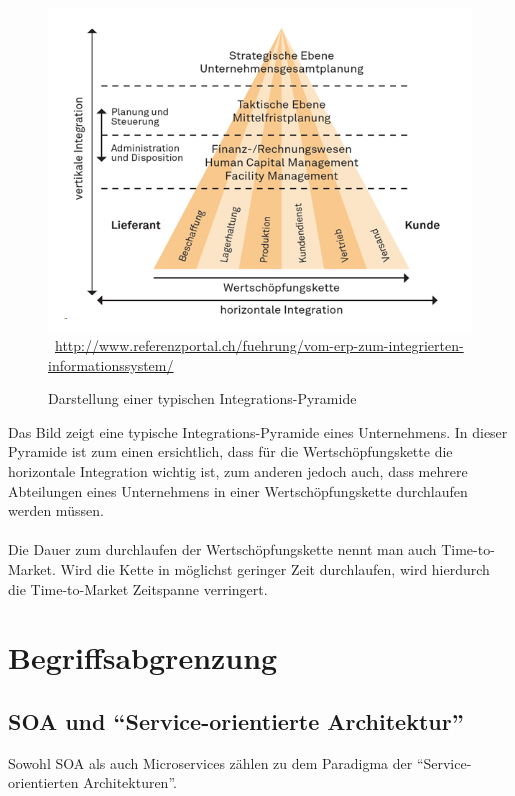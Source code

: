 \begin{figure}[htb]
    \centering 
    \includegraphics[width=\linewidth]{content/images/integrations-pyramide}\
    \quelle\url{http://www.referenzportal.ch/fuehrung/vom-erp-zum-integrierten-informationssystem/}
    \caption[Darstellung einer typischen Integrations-Pyramide]{Darstellung einer typischen Integrations-Pyramide\\}
    \label{fig:integrations-pyramide} 
\end{figure} 
Das Bild zeigt eine typische Integrations-Pyramide eines Unternehmens. In dieser Pyramide ist zum einen ersichtlich, dass für die Wertschöpfungskette die horizontale Integration wichtig ist, zum anderen jedoch auch, dass mehrere Abteilungen eines Unternehmens in einer Wertschöpfungskette durchlaufen werden müssen.
\\\\
Die Dauer zum durchlaufen der Wertschöpfungskette nennt man auch Time-to-Market. Wird die Kette in möglichst geringer Zeit durchlaufen, wird hierdurch die Time-to-Market Zeitspanne verringert.

\section{Begriffsabgrenzung}
\label{sec:Begriffsabgrenzung}

\subsection*{SOA und "`Service-orientierte Architektur"'}
Sowohl SOA als auch Microservices zählen zu dem Paradigma der "`Service-orientierten Architekturen"'.

